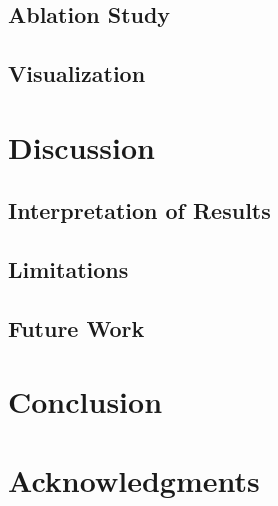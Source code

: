 \documentclass[journal,onecolumn,draftcls]{IEEEtran}
\begin{document}
\subsection{Ablation Study}
\label{sec:exp-ablation}


\subsection{Visualization}
\label{sec:exp-visual}


\section{Discussion}
\label{sec:discussion}

\subsection{Interpretation of Results}
\label{sec:discuss-interpretation}

\subsection{Limitations}
\label{sec:discuss-limitations}

\subsection{Future Work}
\label{sec:discuss-future}

\section{Conclusion}
\label{sec:conclusion}


\section*{Acknowledgments}

{
  
  
}
\end{document}
